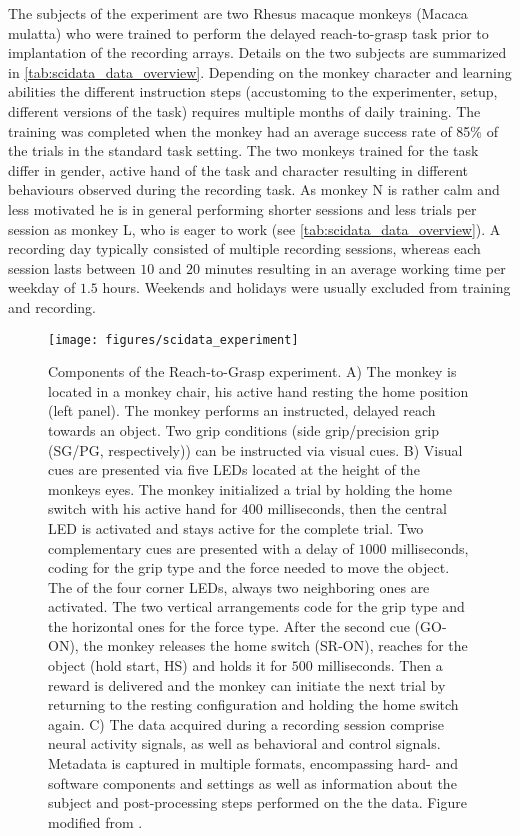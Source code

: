 The subjects of the experiment are two Rhesus macaque monkeys (Macaca mulatta) who were trained to perform the delayed reach-to-grasp task prior to implantation of the recording arrays. Details on the two subjects are summarized in \ref{tab:scidata_data_overview}. Depending on the monkey character and learning abilities the different instruction steps (accustoming to the experimenter, setup, different versions of the task) requires multiple months of daily training. The training was completed when the monkey had an average success rate of 85\% of the trials in the standard task setting.
The two monkeys trained for the task differ in gender, active hand of the task and character resulting in different behaviours observed during the recording task. As monkey N is rather calm and less motivated he is in general performing shorter sessions and less trials per session as monkey L, who is eager to work (see \cref{tab:scidata_data_overview}). A recording day typically consisted of multiple recording sessions, whereas each session lasts between $10$ and $20$ minutes resulting in an average working time per weekday of $1.5$ hours. Weekends and holidays were usually excluded from training and recording.


\begin{figure}[!ht]
\begin{center}
\texttt{[image: figures/scidata\_experiment]}
\caption[Components of the Reach-to-Grasp experiment]{Components of the Reach-to-Grasp experiment. A) The monkey is located in a monkey chair, his active hand resting the home position (left panel). The monkey performs an instructed, delayed reach towards an object. Two grip conditions (side grip/precision grip (SG/PG, respectively)) can be instructed via visual cues. B) Visual cues are presented via five LEDs located at the height of the monkeys eyes. The monkey initialized a trial by holding the home switch with his active hand for $400$ milliseconds, then the central LED is activated and stays active for the complete trial. Two complementary cues are presented with a delay of $1000$ milliseconds, coding for the grip type and the force needed to move the object. The of the four corner LEDs, always two neighboring ones are activated. The two vertical arrangements code for the grip type and the horizontal ones for the force type. After the second cue (GO-ON), the monkey releases the home switch (SR-ON), reaches for the object (hold start, HS) and holds it for $500$ milliseconds. Then a reward is delivered and the monkey can initiate the next trial by returning to the resting configuration and holding the home switch again. C) The data acquired during a recording session comprise neural activity signals, as well as behavioral and control signals. Metadata is captured in multiple formats, encompassing hard- and software components and settings as well as information about the subject and post-processing steps performed on the the data. Figure modified from \citet{Brochier_2018}.}
\label{fig:r2g_introduction}
\end{center}
\end{figure}

